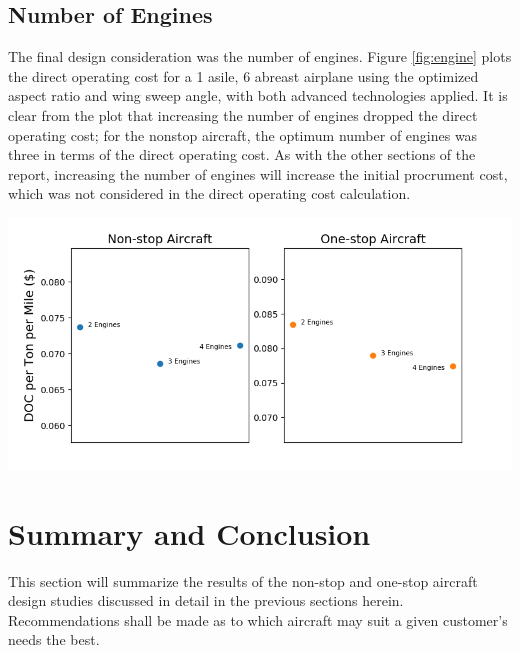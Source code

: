 \documentclass{article}
\begin{document}
    \subsection{Number of Engines}
    \label{sec:engine}
        \begin{flushleft}
            The final design consideration was the number of engines. Figure
            \ref{fig:engine} plots the direct operating cost for a 1 asile, 6
            abreast airplane using the optimized aspect ratio and wing sweep
            angle, with both advanced technologies applied. It is clear from the
            plot that increasing the number of engines dropped the direct
            operating cost; for the nonstop aircraft, the optimum number of
            engines was three in terms of the direct operating cost. As with the
            other sections of the report, increasing the number of engines will
            increase the initial procrument cost, which was not considered in
            the direct operating cost calculation.
        \end{flushleft}

        \begin{center}
            \includegraphics[scale=0.7]{engines.PNG}
            \label{fig:engine}%
        \end{center}


    \section{Summary and Conclusion}
    \label{sec:conclusion}
        \begin{flushleft}
            This section will summarize the results of the non-stop and one-stop
            aircraft design studies discussed in detail in the previous sections
            herein. Recommendations shall be made as to which aircraft may suit a
            given customer's needs the best.
        \end{flushleft}
\end{document}
